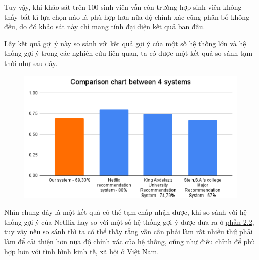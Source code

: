 Tuy vậy, khi khảo sát trên 100 sinh viên vẫn còn trường hợp sinh viên không thấy bất kì lựa chọn nào là phù hợp hơn nữa độ chính xác cũng phân bố không đều, do đó khảo sát này chỉ mang tính đại diện kết quả ban đầu.

Lấy kết quả gợi ý này so sánh với kết quả gợi ý của một số hệ thống lớn và hệ thống gợi ý trong các nghiên cứu liên quan, ta có được một kết quả so sánh tạm thời như sau đây.
\begin{figure}[H]
    \centering
    \includegraphics[width=0.6\linewidth]{comparisonChart.png}
\end{figure}

Nhìn chung đây là một kết quả có thể tạm chấp nhận được, khi so sánh với hệ thống gợi ý của Netflix hay so với một số hệ thống gợi ý được đưa ra ở \hyperref[2.2]{phần 2.2}, tuy vậy nếu so sánh thì ta có thể thấy rằng vẫn cần phải làm rất nhiều thứ phải làm để cải thiện hơn nữa độ chính xác của hệ thống, cũng như điều chỉnh để phù hợp hơn với tình hình kinh tế, xã hội ở Việt Nam.